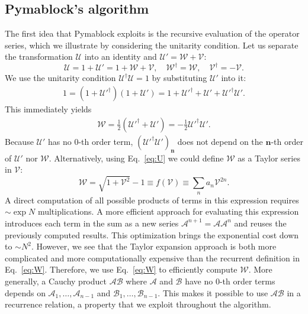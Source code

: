 \subsection{Pymablock's algorithm}
\label{sec:pymablock_algorithm}

The first idea that Pymablock exploits is the recursive evaluation of the operator series, which we illustrate by considering the unitarity condition.
Let us separate the transformation $\mathcal{U}$ into an identity and $\mathcal{U}' = \mathcal{W} + \mathcal{V}$:
%
\begin{equation}
\label{eq:U}
\mathcal{U} = 1 + \mathcal{U}' = 1 + \mathcal{W} + \mathcal{V},\quad \mathcal{W}^\dagger = \mathcal{W},\quad \mathcal{V}^\dagger = -\mathcal{V}.
\end{equation}
%
We use the unitarity condition $\mathcal{U}^\dagger \mathcal{U} = 1$ by substituting $\mathcal{U}'$ into it:
%
\begin{gather}
\label{eq:unitarity}
  1 = (1 + \mathcal{U}'^\dagger)(1+\mathcal{U}') = 1 + \mathcal{U}'^\dagger + \mathcal{U}' + \mathcal{U}'^\dagger \mathcal{U}'.
\end{gather}
%
This immediately yields \begin{gather}
\label{eq:W}
\mathcal{W} = \frac{1}{2}(\mathcal{U}'^\dagger + \mathcal{U}') = -\frac{1}{2} \mathcal{U}'^\dagger \mathcal{U}'.
\end{gather}
%
Because $\mathcal{U}'$ has no $0$-th order term, $(\mathcal{U}'^\dagger \mathcal{U}')_\mathbf{n}$ does not depend on the $\mathbf{n}$-th order of $\mathcal{U}'$ nor $\mathcal{W}$.
Alternatively, using Eq.~\eqref{eq:U} we could define $\mathcal{W}$ as a Taylor series in $\mathcal{V}$:
%
$$
\mathcal{W} = \sqrt{1 + \mathcal{V}^2} - 1 \equiv f(\mathcal{V}) \equiv \sum_n a_n \mathcal{V}^{2n}.
$$
%
A direct computation of all possible products of terms in this expression requires $\sim \exp N$ multiplications.
A more efficient approach for evaluating this expression introduces each term in the sum as a new series $\mathcal{A}^{n+1} = \mathcal{A}\mathcal{A}^{n}$ and reuses the previously computed results.
This optimization brings the exponential cost down to $\sim N^2$.
However, we see that the Taylor expansion approach is both more complicated and more computationally expensive than the recurrent definition in Eq.~\eqref{eq:W}.
Therefore, we use Eq.~\eqref{eq:W} to efficiently compute $\mathcal{W}$.
More generally, a Cauchy product $\mathcal{A}\mathcal{B}$ where $\mathcal{A}$ and $\mathcal{B}$ have no $0$-th order terms depends on $\mathcal{A}_1, \ldots, \mathcal{A}_{n-1}$ and $\mathcal{B}_1, \ldots, \mathcal{B}_{n-1}$.
This makes it possible to use $\mathcal{AB}$ in a recurrence relation, a property that we exploit throughout the algorithm.

